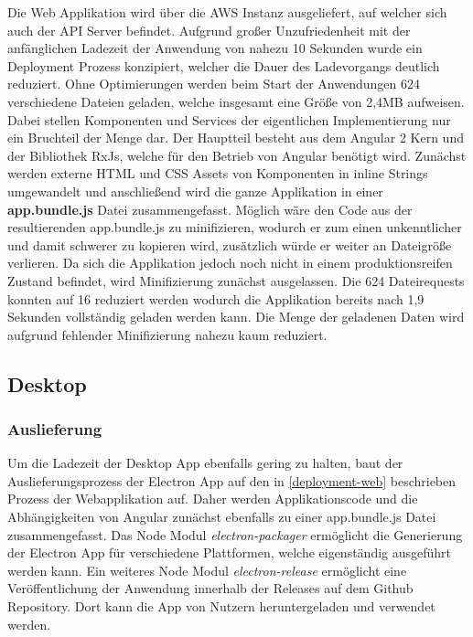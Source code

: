 Die Web Applikation wird über die \ac{AWS} Instanz ausgeliefert, auf welcher sich auch der \ac{API} Server befindet.
Aufgrund großer Unzufriedenheit mit der anfänglichen Ladezeit der Anwendung von nahezu 10 Sekunden wurde ein Deployment
Prozess konzipiert, welcher die Dauer des Ladevorgangs deutlich reduziert.
Ohne Optimierungen werden beim Start der Anwendungen 624 verschiedene Dateien geladen,
welche insgesamt eine Größe von 2,4MB aufweisen.
Dabei stellen Komponenten und Services der eigentlichen Implementierung nur ein Bruchteil der Menge dar.
Der Hauptteil besteht aus dem Angular 2 Kern und der Bibliothek RxJs, welche für den Betrieb von Angular benötigt wird.
Zunächst werden externe \ac{HTML} und \ac{CSS} Assets von Komponenten in
inline Strings umgewandelt und anschließend wird die ganze Applikation in einer \textbf{app.bundle.js} Datei zusammengefasst.
Möglich wäre den Code aus der resultierenden app.bundle.js zu minifizieren,
wodurch er zum einen unkenntlicher und damit schwerer zu kopieren wird,
zusätzlich würde er weiter an Dateigröße verlieren. Da sich die Applikation \projectname{}
jedoch noch nicht in einem produktionsreifen Zustand befindet, wird Minifizierung zunächst ausgelassen.
Die 624 Dateirequests konnten auf 16 reduziert werden wodurch die Applikation bereits nach 1,9
Sekunden vollständig geladen werden kann.
Die Menge der geladenen Daten wird aufgrund fehlender Minifizierung nahezu kaum reduziert.

\subsection{Desktop}

\subsubsection{Auslieferung}
Um die Ladezeit der Desktop App ebenfalls gering zu halten, baut der Auslieferungsprozess der Electron App
auf den in \ref{deployment-web} beschrieben Prozess der Webapplikation auf. Daher werden Applikationscode und die
Abhängigkeiten von Angular zunächst ebenfalls zu einer app.bundle.js Datei zusammengefasst.
Das Node Modul \emph{electron-packager} ermöglicht die Generierung der Electron App für verschiedene Plattformen,
welche eigenständig ausgeführt werden kann.
Ein weiteres Node Modul \emph{electron-release} ermöglicht eine Veröffentlichung
der Anwendung innerhalb der Releases auf dem Github Repository.
Dort kann die App von Nutzern heruntergeladen und verwendet werden.


